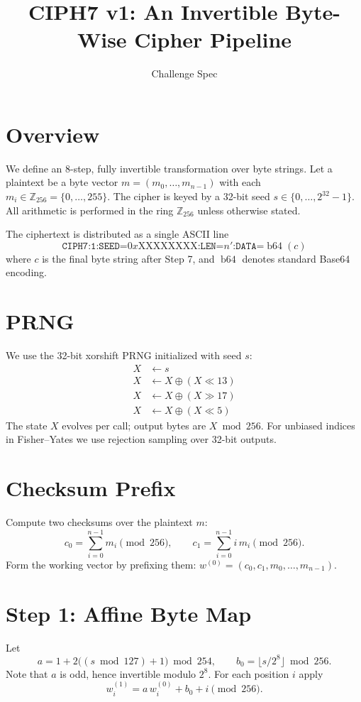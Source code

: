 \documentclass[11pt]{article}
\title{CIPH7 v1: An Invertible Byte-Wise Cipher Pipeline}
\author{Challenge Spec}
\date{}
\begin{document}
\maketitle

\section*{Overview}
We define an 8-step, fully invertible transformation over byte strings. Let a plaintext be a byte vector \(m = (m_0,\dots,m_{n-1})\) with each \(m_i \in \mathbb{Z}_{256} = \{0,\dots,255\}\). The cipher is keyed by a 32-bit seed \(s \in \{0,\dots,2^{32}-1\}\). All arithmetic is performed in the ring \(\mathbb{Z}_{256}\) unless otherwise stated.

The ciphertext is distributed as a single ASCII line
\[
\texttt{CIPH7:1:SEED=}0x\text{XXXXXXXX}\texttt{:LEN=}n'\texttt{:DATA=}\operatorname{b64}(c)
\]
where \(c\) is the final byte string after Step 7, and \(\operatorname{b64}\) denotes standard Base64 encoding.

\section*{PRNG}
We use the 32-bit xorshift PRNG initialized with seed \(s\):
\begin{align*}
X &\leftarrow s \\
X &\leftarrow X \oplus (X \ll 13) \\
X &\leftarrow X \oplus (X \gg 17) \\
X &\leftarrow X \oplus (X \ll 5)
\end{align*}
The state \(X\) evolves per call; output bytes are \(X \bmod 256\). For unbiased indices in Fisher--Yates we use rejection sampling over 32-bit outputs.

\section*{Checksum Prefix}
Compute two checksums over the plaintext \(m\):
\[
 c_0 = \sum_{i=0}^{n-1} m_i \pmod{256}, \qquad c_1 = \sum_{i=0}^{n-1} i\,m_i \pmod{256}.
\]
Form the working vector by prefixing them: \(w^{(0)} = (c_0, c_1, m_0,\dots,m_{n-1})\).

\section*{Step 1: Affine Byte Map}
Let
\[
 a = 1 + 2\big((s \bmod 127) + 1\big) \bmod 254, \qquad b_0 = \big\lfloor s/2^8 \big\rfloor \bmod 256.
\]
Note that \(a\) is odd, hence invertible modulo \(2^8\). For each position \(i\) apply
\[
 w^{(1)}_i = a\,w^{(0)}_i + b_0 + i \pmod{256}.
\]
\end{document}
